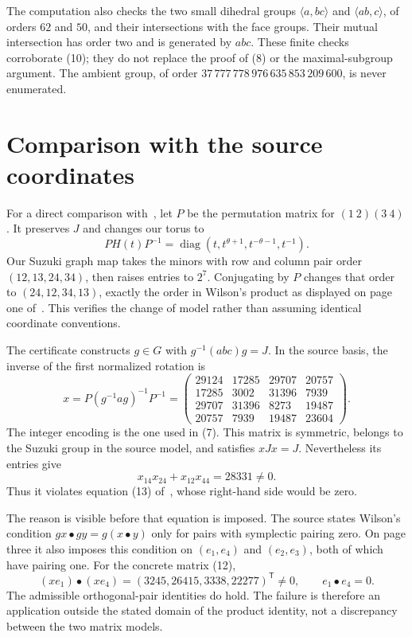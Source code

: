 \documentclass[11pt,a4paper]{article}
\newcommand{\gen}[1]{\langle#1\rangle}
\begin{document}
The computation also checks the two small dihedral groups
$\gen{a,bc}$ and $\gen{ab,c}$, of orders $62$ and $50$, and their
intersections with the face groups. Their mutual intersection has
order two and is generated by $abc$. These finite checks corroborate
(10); they do not replace the proof of (8) or the maximal-subgroup
argument. The ambient group, of order
$37\,777\,778\,976\,635\,853\,209\,600$, is never enumerated.

\section{Comparison with the source coordinates}
For a direct comparison with~\cite{Spiga}, let $P$ be the permutation
matrix for $(1\ 2)(3\ 4)$. It preserves $J$ and changes our torus to
\[
 PH(t)P^{-1}
  =\operatorname{diag}(t,t^{\theta+1},t^{-\theta-1},t^{-1}).
\]
Our Suzuki graph map takes the minors with row and column pair order
$(12,13,24,34)$, then raises entries to $2^7$. Conjugating by $P$
changes that order to $(24,12,34,13)$, exactly the order in Wilson's
product as displayed on page one of~\cite{Spiga}. This verifies the
change of model rather than assuming identical coordinate conventions.

The certificate constructs $g\in G$ with $g^{-1}(abc)g=J$.
In the source basis, the inverse of the first normalized rotation is
\[
 x=P(g^{-1}ag)^{-1}P^{-1}
  =\begin{pmatrix}
 29124&17285&29707&20757\\
 17285&3002&31396&7939\\
 29707&31396&8273&19487\\
 20757&7939&19487&23604
 \end{pmatrix}.
 \tag{12}
\]
The integer encoding is the one used in (7). This matrix is symmetric,
belongs to the Suzuki group in the source model, and satisfies
$xJx=J$. Nevertheless its entries give
\[
 x_{14}x_{24}+x_{12}x_{44}=28331\ne0.
 \tag{13}
\]
Thus it violates equation (13) of~\cite{Spiga}, whose right-hand side
would be zero.

The reason is visible before that equation is imposed. The source
states Wilson's condition $gx\mathbin\bullet gy=g(x\mathbin\bullet y)$
only for pairs with symplectic pairing zero. On page three it also
imposes this condition on $(e_1,e_4)$ and $(e_2,e_3)$, both of which
have pairing one. For the concrete matrix (12),
\[
 (xe_1)\mathbin\bullet(xe_4)
   =(3245,26415,3338,22277)^{\mathsf T}\ne0,
 \qquad e_1\mathbin\bullet e_4=0.
\]
The admissible orthogonal-pair identities do hold. The failure is
therefore an application outside the stated domain of the product
identity, not a discrepancy between the two matrix models.
\end{document}

